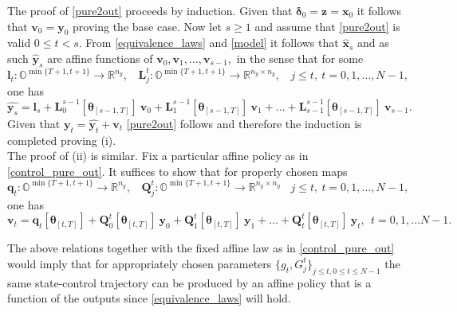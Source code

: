 \documentclass[letterpaper,11pt]{article}
\begin{document}
The proof of \eqref{pure2out} proceeds by induction. 
Given that $ \bm{\delta}_0  =  \mathbf{z} = \mathbf{x}_0$ it follows that 
$ \mathbf{v}_0 = \mathbf{y}_0$ proving the base case. 
Now let $ s \geq 1$ and assume that \eqref{pure2out} is valid $ 0 \leq t < s$. 
From \eqref{equivalence_laws} and \eqref{model} it follows that  $\hat{\mathbf{x}}_s$ and as such  $\hat{\mathbf{y}}_s$
are affine functions of $ \mathbf{v}_0, \mathbf{v}_1, \hdots, \mathbf{v}_{s-1},$ in the sense that for some 
$$
\mathbf{l}_{t} :  \mathbb{O}^{\min{\{T+1,t+1\}}} \rightarrow \mathbb{R}^{n_y},~~~~ 
\mathbf{L}_j^t :  \mathbb{O}^{\min{\{T+1,t+1\}}} \rightarrow \mathbb{R}^{n_y \times n_y},
~~~~j \leq t, ~ t =0,1, \hdots, N-1,
$$
one has 
$$
\hat{\mathbf{y}_s} = \mathbf{l}_{s} + 
\mathbf{L}_0^{s-1}[\bm{\theta}_{[s-1,T]}] ~ \mathbf{v}_0 + 
\mathbf{L}_1^{s-1}[\bm{\theta}_{[s-1,T]}] ~ \mathbf{v}_1 + \hdots + \mathbf{L}_{s-1}^{s-1}[\bm{\theta}_{[s-1,T]}] ~ \mathbf{v}_{s-1}.
$$
Given that $\mathbf{y}_t = \hat{\mathbf{y}_t} + \mathbf{v}_t$ \eqref{pure2out}
follows and therefore the induction is completed proving (i). \\

The proof of (ii) is similar.   Fix a particular affine policy as in \eqref{control_pure_out}. It suffices to show that for
properly chosen maps 
\begin{equation}
\mathbf{q}_{t} :  \mathbb{O}^{\min{\{T+1,t+1\}}} \rightarrow \mathbb{R}^{n_y},~~~~ 
\mathbf{Q}_j^t :  \mathbb{O}^{\min{\{T+1,t+1\}}} \rightarrow \mathbb{R}^{n_y \times n_y}
~~~~j \leq t, ~ t =0,1, \hdots, N-1,
\end{equation}
one has 
\begin{equation}
\label{out2pure}
\mathbf{v}_t = \mathbf{q}_{t}[\bm{\theta}_{[t,T]}] + \mathbf{Q}_0^t[\bm{\theta}_{[t,T]}] ~ \mathbf{y}_0 + 
\mathbf{Q}_1^t[\bm{\theta}_{[t,T]}] ~ \mathbf{y}_1 + \hdots + \mathbf{Q}_t^t[\bm{\theta}_{[t,T]}] ~ \mathbf{y}_t, ~~ t =0,1, \hdots N-1 .
\end{equation}

The above relations together with the fixed affine law as in \eqref{control_pure_out} would imply that
for appropriately chosen parameters $ \{ g_{t}, G_j^t \}_{j \leq t,0 \leq t \leq N-1}$ 
the same state-control trajectory can be produced by
an affine policy that is a function of the outputs since 
\eqref{equivalence_laws} will hold. 
\end{document}
